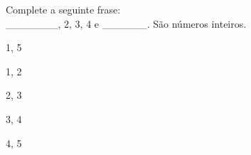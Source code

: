 \question[10]
Complete a seguinte frase:\\
_______, 2, 3, 4 e ______. São números inteiros.
\\
\begin{choices}
\item 1, 5 %
\item 1, 2 
\item 2, 3
\item 3, 4 
\item 4, 5 
\end{choices}
\answerline


